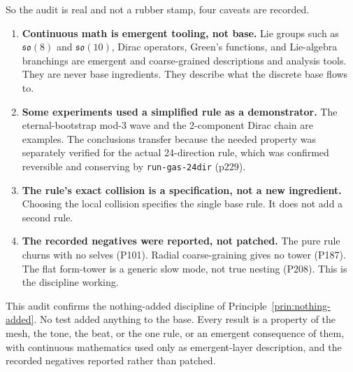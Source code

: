So the audit is real and not a rubber stamp, four caveats are recorded.

\begin{enumerate}
  \item \textbf{Continuous math is emergent tooling, not base.} Lie groups such as $\mathfrak{so}(8)$ and
  $\mathfrak{so}(10)$, Dirac operators, Green's functions, and Lie-algebra branchings are emergent and
  coarse-grained descriptions and analysis tools. They are never base ingredients. They describe what the discrete
  base flows to.
  \item \textbf{Some experiments used a simplified rule as a demonstrator.} The eternal-bootstrap mod-3 wave and
  the 2-component Dirac chain are examples. The conclusions transfer because the needed property was separately
  verified for the actual 24-direction rule, which was confirmed reversible and conserving by
  \texttt{run-gas-24dir} (p229).
  \item \textbf{The rule's exact collision is a specification, not a new ingredient.} Choosing the local collision
  specifies the single base rule. It does not add a second rule.
  \item \textbf{The recorded negatives were reported, not patched.} The pure rule churns with no selves (P101).
  Radial coarse-graining gives no tower (P187). The flat form-tower is a generic slow mode, not true nesting
  (P208). This is the discipline working.
\end{enumerate}

This audit confirms the nothing-added discipline of Principle~\ref{prin:nothing-added}. No test added anything to
the base. Every result is a property of the mesh, the tone, the beat, or the one rule, or an emergent consequence
of them, with continuous mathematics used only as emergent-layer description, and the recorded negatives reported
rather than patched.
